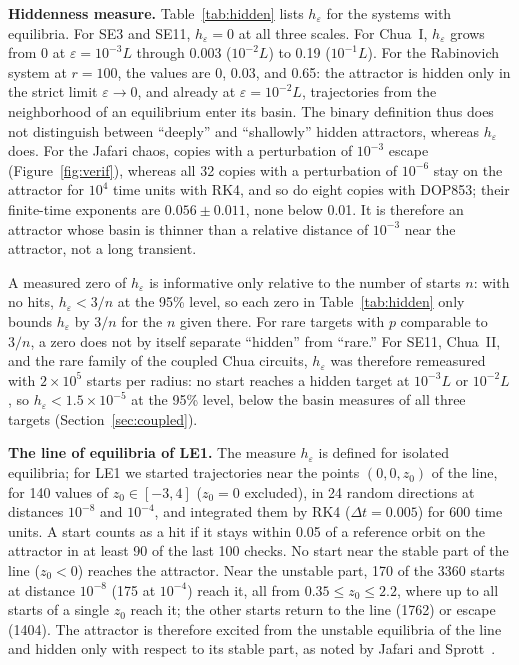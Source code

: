 \textbf{Hiddenness measure.} Table~\ref{tab:hidden} lists $h_\varepsilon$ for the systems with equilibria. For SE3 and SE11, $h_\varepsilon=0$ at all three scales. For Chua~I, $h_\varepsilon$ grows from 0 at $\varepsilon=10^{-3}L$ through 0.003 ($10^{-2}L$) to 0.19 ($10^{-1}L$). For the Rabinovich system at $r=100$, the values are 0, 0.03, and 0.65: the attractor is hidden only in the strict limit $\varepsilon\to0$, and already at $\varepsilon=10^{-2}L$, trajectories from the neighborhood of an equilibrium enter its basin. The binary definition thus does not distinguish between ``deeply'' and ``shallowly'' hidden attractors, whereas $h_\varepsilon$ does. For the Jafari chaos, copies with a perturbation of $10^{-3}$ escape (Figure~\ref{fig:verif}), whereas all 32 copies with a perturbation of $10^{-6}$ stay on the attractor for $10^4$ time units with RK4, and so do eight copies with DOP853; their finite-time exponents are $0.056\pm0.011$, none below 0.01. It is therefore an attractor whose basin is thinner than a relative distance of $10^{-3}$ near the attractor, not a long transient.

A measured zero of $h_\varepsilon$ is informative only relative to the number of starts $n$: with no hits, $h_\varepsilon<3/n$ at the 95\% level, so each zero in Table~\ref{tab:hidden} only bounds $h_\varepsilon$ by $3/n$ for the $n$ given there. For rare targets with $p$ comparable to $3/n$, a zero does not by itself separate ``hidden'' from ``rare.'' For SE11, Chua~II, and the rare family of the coupled Chua circuits, $h_\varepsilon$ was therefore remeasured with $2\times10^5$ starts per radius: no start reaches a hidden target at $10^{-3}L$ or $10^{-2}L$, so $h_\varepsilon<1.5\times10^{-5}$ at the 95\% level, below the basin measures of all three targets (Section~\ref{sec:coupled}).

\textbf{The line of equilibria of LE1.} The measure $h_\varepsilon$ is defined for isolated equilibria; for LE1 we started trajectories near the points $(0,0,z_0)$ of the line, for 140 values of $z_0\in[-3,4]$ ($z_0=0$ excluded), in 24 random directions at distances $10^{-8}$ and $10^{-4}$, and integrated them by RK4 ($\Delta t=0.005$) for 600 time units. A start counts as a hit if it stays within 0.05 of a reference orbit on the attractor in at least 90 of the last 100 checks. No start near the stable part of the line ($z_0<0$) reaches the attractor. Near the unstable part, 170 of the 3360 starts at distance $10^{-8}$ (175 at $10^{-4}$) reach it, all from $0.35\le z_0\le2.2$, where up to all starts of a single $z_0$ reach it; the other starts return to the line (1762) or escape (1404). The attractor is therefore excited from the unstable equilibria of the line and hidden only with respect to its stable part, as noted by Jafari and Sprott~\cite{JafariSprott2013}.

